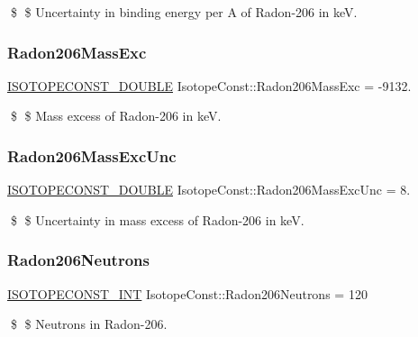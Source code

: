 \$ \$ Uncertainty in binding energy per A of Radon-\/206 in keV. \mbox{\label{group___isotope_const-_radon-_rn206_gac6352b28b325f5c720ab0ae353881409}} 
\subsubsection{\texorpdfstring{Radon206\+Mass\+Exc}{Radon206MassExc}}
{\footnotesize\ttfamily \mbox{\hyperlink{group___isotope_const-_macros_ga8f45a7272ce02c0b4c65c44636ed719a}{I\+S\+O\+T\+O\+P\+E\+C\+O\+N\+S\+T\+\_\+\+D\+O\+U\+B\+LE}} Isotope\+Const\+::\+Radon206\+Mass\+Exc = -\/9132.}

\$ \$ Mass excess of Radon-\/206 in keV. \mbox{\label{group___isotope_const-_radon-_rn206_gacb71ef432f44483bc2ad454f6412c11a}} 
\subsubsection{\texorpdfstring{Radon206\+Mass\+Exc\+Unc}{Radon206MassExcUnc}}
{\footnotesize\ttfamily \mbox{\hyperlink{group___isotope_const-_macros_ga8f45a7272ce02c0b4c65c44636ed719a}{I\+S\+O\+T\+O\+P\+E\+C\+O\+N\+S\+T\+\_\+\+D\+O\+U\+B\+LE}} Isotope\+Const\+::\+Radon206\+Mass\+Exc\+Unc = 8.}

\$ \$ Uncertainty in mass excess of Radon-\/206 in keV. \mbox{\label{group___isotope_const-_radon-_rn206_gafc6eaea258384fe59030fa00d54cac9f}} 
\subsubsection{\texorpdfstring{Radon206\+Neutrons}{Radon206Neutrons}}
{\footnotesize\ttfamily \mbox{\hyperlink{group___isotope_const-_macros_ga5f18360b3e99483a35c32d789e62621c}{I\+S\+O\+T\+O\+P\+E\+C\+O\+N\+S\+T\+\_\+\+I\+NT}} Isotope\+Const\+::\+Radon206\+Neutrons = 120}

\$ \$ Neutrons in Radon-\/206. \mbox{\label{group___isotope_const-_radon-_rn206_ga9bf100e58421125b1e86c863d498a062}} 
